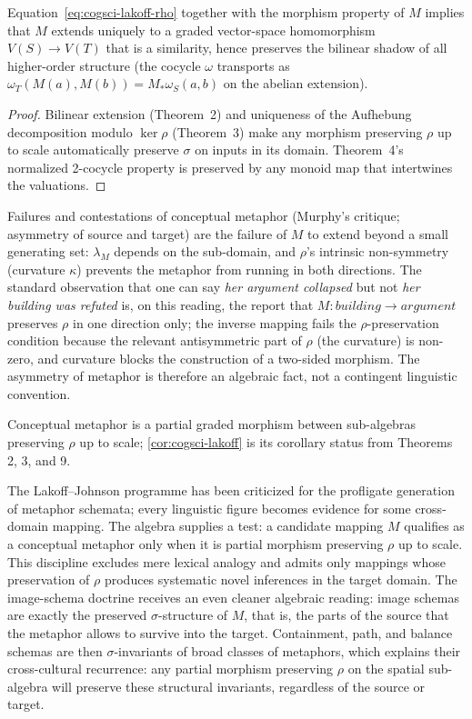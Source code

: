 \begin{corollary}\label{cor:cogsci-lakoff}
Equation~\eqref{eq:cogsci-lakoff-rho} together with the morphism property
of $M$ implies that $M$ extends uniquely to a graded vector-space
homomorphism $V(S)\to V(T)$ that is a similarity, hence preserves the
bilinear shadow of all higher-order structure (the cocycle $\omega$
transports as $\omega_T(M(a),M(b))=M_*\omega_S(a,b)$ on the abelian
extension).
\end{corollary}

\begin{proof}
Bilinear extension (Theorem~2) and uniqueness of the Aufhebung
decomposition modulo $\ker\rho$ (Theorem~3) make any morphism preserving
$\rho$ up to scale automatically preserve $\sigma$ on inputs in its
domain. Theorem~4's normalized 2-cocycle property is preserved by any
monoid map that intertwines the valuations.
\end{proof}

Failures and contestations of conceptual metaphor (Murphy's critique;
asymmetry of source and target) are the failure of $M$ to extend beyond a
small generating set: $\lambda_M$ depends on the sub-domain, and $\rho$'s
intrinsic non-symmetry (curvature $\kappa$) prevents the metaphor from
running in both directions. The standard observation that one can say
\emph{her argument collapsed} but not \emph{her building was refuted} is,
on this reading, the report that $M:\mathit{building}\to\mathit{argument}$
preserves $\rho$ in one direction only; the inverse mapping fails the
$\rho$-preservation condition because the relevant antisymmetric part of
$\rho$ (the curvature) is non-zero, and curvature blocks the construction
of a two-sided morphism. The asymmetry of metaphor is therefore an
algebraic fact, not a contingent linguistic convention.

\formalstatus Conceptual metaphor is a partial graded morphism between
sub-algebras preserving $\rho$ up to scale; \cref{cor:cogsci-lakoff} is
its corollary status from Theorems 2, 3, and 9.

\litcomment The Lakoff--Johnson programme has been criticized for the
profligate generation of metaphor schemata; every linguistic figure
becomes evidence for some cross-domain mapping. The algebra supplies a
test: a candidate mapping $M$ qualifies as a conceptual metaphor only
when it is partial morphism preserving $\rho$ up to scale. This
discipline excludes mere lexical analogy and admits only mappings whose
preservation of $\rho$ produces systematic novel inferences in the
target domain. The image-schema doctrine receives an even cleaner
algebraic reading: image schemas are exactly the preserved
$\sigma$-structure of $M$, that is, the parts of the source that the
metaphor allows to survive into the target. Containment, path, and
balance schemas are then $\sigma$-invariants of broad classes of
metaphors, which explains their cross-cultural recurrence: any partial
morphism preserving $\rho$ on the spatial sub-algebra will preserve
these structural invariants, regardless of the source or target.


